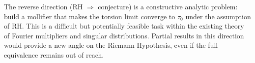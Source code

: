 \documentclass[12pt,a4paper]{article}
\begin{document}
The reverse direction (RH \(\Rightarrow\) conjecture) is a constructive analytic problem:
build a mollifier that makes the torsion limit converge to \(\tau_0\) under the assumption
of RH.  This is a difficult but potentially feasible task within the existing theory of
Fourier multipliers and singular distributions.  Partial results in this direction would
provide a new angle on the Riemann Hypothesis, even if the full equivalence remains out of
reach.
\end{document}

